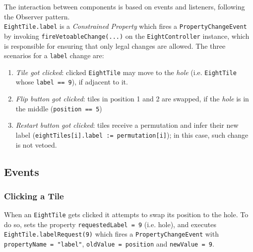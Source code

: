 The interaction between components is based on events and listeners, following the Observer pattern.\\
\lstinline|EightTile.label| is a \textit{Constrained Property} which fires a \lstinline|PropertyChangeEvent| by invoking \lstinline|fireVetoableChange(...)| on the \lstinline|EightController| instance, which is responsible for ensuring that only legal changes are allowed.
The three scenarios for a \lstinline|label| change are:
\begin{enumerate}
   \item \textit{Tile got clicked}: clicked \lstinline|EightTile| may move to the \textit{hole} (i.e. \lstinline|EightTile| whose \lstinline|label == 9|), if adjacent to it.
   \item \textit{Flip button got clicked}: tiles in position 1 and 2 are swapped, if the \textit{hole} is in the middle (\lstinline|position == 5|) 
   \item \textit{Restart button got clicked}: tiles receive a permutation and infer their new label (\lstinline|eightTiles[i].label := permutation[i]|); in this case, such change is not vetoed.
\end{enumerate} 

\subsection{Events}
\subsubsection{Clicking a Tile}
When an \lstinline|EightTile| gets clicked it attempts to swap its position to the hole. To do so, sets the property \lstinline|requestedLabel = 9| (i.e. hole), and executes \lstinline|EightTile.labelRequest(9)| which fires a \lstinline|PropertyChangeEvent| with \lstinline|propertyName = "label"|, \lstinline|oldValue = position| and \lstinline|newValue = 9|.

